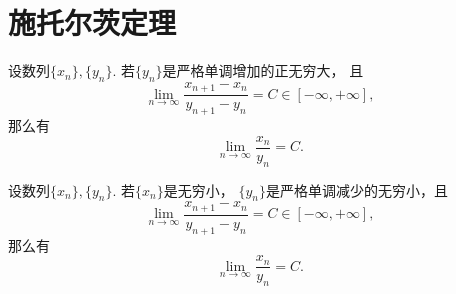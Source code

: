 \section{施托尔茨定理}
\begin{theorem}[施托尔茨定理I]\label{theorem:极限.施托尔茨定理1}
设数列\(\{x_n\},\{y_n\}\).
若\(\{y_n\}\)是严格单调增加的正无穷大，
且\begin{equation*}
	\lim_{n\to\infty} \frac{x_{n+1}-x_n}{y_{n+1}-y_n}
	= C
	\in[-\infty,+\infty],
\end{equation*}
那么有\begin{equation*}
	\lim_{n\to\infty} \frac{x_n}{y_n}
	= C.
\end{equation*}
\end{theorem}

\begin{theorem}[施托尔茨定理II]\label{theorem:极限.施托尔茨定理2}
设数列\(\{x_n\},\{y_n\}\).
若\(\{x_n\}\)是无穷小，
\(\{y_n\}\)是严格单调减少的无穷小，且\begin{equation*}
	\lim_{n\to\infty} \frac{x_{n+1}-x_n}{y_{n+1}-y_n}
	= C
	\in[-\infty,+\infty],
\end{equation*}
那么有\begin{equation*}
	\lim_{n\to\infty} \frac{x_n}{y_n}
	= C.
\end{equation*}
\end{theorem}


